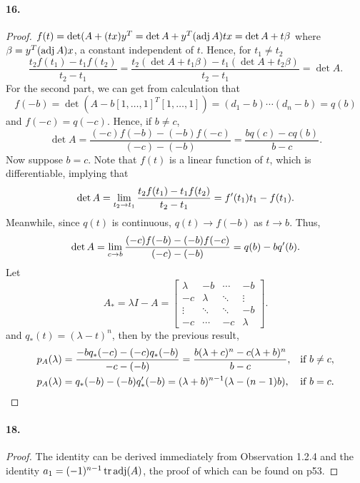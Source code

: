   \paragraph{16.}
  \begin{proof}
    $f(t)=\det(A+(tx)y^T = \det A + y^T(\operatorname{adj} A)tx = \det A + t\beta$ where 
    $\beta = y^T(\operatorname{adj} A)x$, a constant independent of $t$. Hence, for $t_1\ne
    t_2$
    \[
      \frac{t_2f(t_1)-t_1f(t_2)}{t_2-t_1} 
      = \frac{t_2(\det A + t_1\beta) - t_1(\det A + t_2\beta)}{t_2-t_1}
      = \det A.
    \]
    For the second part, we can get from calculation that
    \[
      f(-b)=\det(A-b[1,\dots,1]^T[1,\dots,1]) = (d_1-b)\cdots(d_n-b)=q(b)
    \]
    and $f(-c)=q(-c)$. Hence, if $b\ne c$,
    \[
      \det A = \frac{(-c)f(-b)- (-b)f(-c)}{(-c)-(-b)}=\frac{bq(c)-cq(b)}{b-c}.
    \]
    Now suppose $b=c$. Note that $f(t)$ is a linear function of $t$, which is 
    differentiable, implying that 
    \[
      \det A = \lim_{t_2\to t_1}\frac{t_2f(t_1)-t_1f(t_2)}{t_2-t_1} 
      = f^\prime(t_1)t_1 - f(t_1).
    \]
    Meanwhile, since $q(t)$ is continuous, $q(t)\to f(-b)$ as $t\to b$. Thus,
    \[
      \det A = \lim_{c\to b}\frac{(-c)f(-b)- (-b)f(-c)}{(-c)-(-b)}
      = q(b) - bq^\prime(b).
    \]
    Let 
    \[
      A_* = \lambda I - A = 
      \begin{bmatrix}
        \lambda & -b      & \cdots & -b \\
        -c      & \lambda & \ddots & \vdots \\
        \vdots  & \ddots  & \ddots & -b \\
        -c      & \cdots  & -c     & \lambda 
      \end{bmatrix}.
    \]
    and $q_*(t)=(\lambda - t)^n$, then by the previous result,
    \begin{align*}
      p_A(\lambda) &= \frac{-bq_*(-c) - (-c)q_*(-b)}{-c-(-b)} 
                    = \frac{b(\lambda+c)^n - c(\lambda+b)^n}{b-c}, 
                      & \text{if } b\ne c, \\ 
      p_A(\lambda) &= q_*(-b)-(-b)q_*^\prime(-b) 
                    = (\lambda+b)^{n-1}(\lambda-(n-1)b),
                      & \text{if } b=c. 
    \end{align*}
  \end{proof}

  \paragraph{18.}
  \begin{proof}
    The identity can be derived immediately from Observation 1.2.4 and the 
    identity $a_1 = (-1)^{n-1}\operatorname{tr}\operatorname{adj}(A)$, the proof of which can be found on 
    p53.
  \end{proof}

